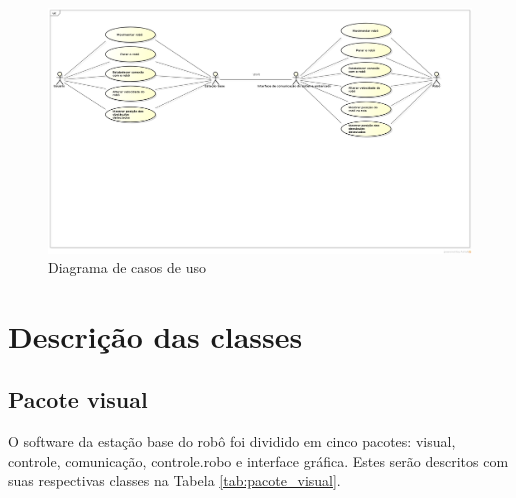 \begin{figure}[H]
  \centering
  \includegraphics[width=\textwidth, keepaspectratio]{./figuras/diagrama_casos_de_uso_v2.png}
  \caption{Diagrama de casos de uso}
  \label{fig:diagrama_casos_de_uso}
\end{figure}

\section{Descrição das classes}

\subsection{Pacote visual}

O software da estação base do robô foi dividido em cinco pacotes:  visual, controle, comunicação, controle.robo e interface gráfica. Estes serão descritos com suas respectivas classes na Tabela \ref{tab:pacote_visual}.

